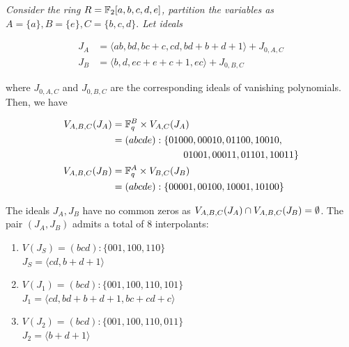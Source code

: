 \begin{Example}
\label{ex:main}
{\it 
Consider the ring $R = {\mathbb{F}}_2[a, b, c, d,e]$, partition the variables as
 $A = \{a\}, B = \{e\}, C = \{b,c,d\}.$
Let ideals 

\vspace{-0.2in} 

\begin{align*}
 J_A &= \langle ab, bd, bc + c,
 cd, bd + b + d + 1
 \rangle + J_{0,A,C}\\
 J_B &= \langle b,d,ec+e+c+1,
 ec
 \rangle + J_{0,B,C}
 \end{align*}

\vspace{-0.1in} 

where $J_{0,A,C}$ and $J_{0,B,C}$ are the corresponding ideals of vanishing
polynomials. Then, we have

\vspace{-0.2in} 

\begin{align*}
{V_{A,B,C}}(J_A) &= {\mathbb{F}}_{q}^B \times {V_{A,C}}(J_A)  \\
&= (abcde):\{ 01000,00010,01100,10010, \\
& ~~~~~~~~~~~~~~~~~~~~~~ 01001,00011,01101,10011 \} \\
{V_{A,B,C}}(J_B) &= {\mathbb{F}}_{q}^A \times {V_{B,C}}(J_B) \\
&= (abcde):\{00001,00100,10001,10100\}
\end{align*} 

The ideals $J_A, J_B$ have no common zeros as ${V_{A,B,C}}(J_A) \cap
{V_{A,B,C}}(J_B) = \emptyset$.   
The pair $(J_A, J_B)$ admits a total of 8 interpolants:\\

\begin{minipage}[c]{0.5\textwidth}

{\small
\begin{enumerate}
\item $V(J_S) = (bcd): \{001,100,110\}$\\ 
$J_S = \langle cd, b + d+ 1 \rangle$

\item  	 	$V(J_1) = (bcd): \{001,100,110,101\}$\\
$J_1 = \langle cd,bd+b+d+1,bc+cd+c \rangle$ 

\item 
 	$V(J_2) = (bcd): \{001,100,110,011\}$ \\
 	$J_2 = \langle b+d+1 \rangle$ 


\end{enumerate}}
\end{minipage}}
\end{Example}
